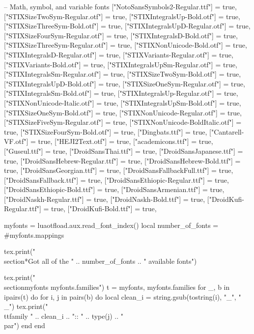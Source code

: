\documentclass{article}
\begin{document}
\begin{luacode*}
{    -- Math, symbol, and variable fonts
    ["NotoSansSymbols2-Regular.ttf"] = true,
    ["STIXSizeTwoSym-Regular.otf"] = true,
    ["STIXIntegralsUp-Bold.otf"] = true,
    ["STIXSizeThreeSym-Bold.otf"] = true,
    ["STIXIntegralsUpD-Regular.otf"] = true,
    ["STIXSizeFourSym-Regular.otf"] = true,
    ["STIXIntegralsD-Bold.otf"] = true,
    ["STIXSizeThreeSym-Regular.otf"] = true,
    ["STIXNonUnicode-Bold.otf"] = true,
    ["STIXIntegralsD-Regular.otf"] = true,
    ["STIXVariants-Regular.otf"] = true,
    ["STIXVariants-Bold.otf"] = true,
    ["STIXIntegralsUpSm-Regular.otf"] = true,
    ["STIXIntegralsSm-Regular.otf"] = true,
    ["STIXSizeTwoSym-Bold.otf"] = true,
    ["STIXIntegralsUpD-Bold.otf"] = true,
    ["STIXSizeOneSym-Regular.otf"] = true,
    ["STIXIntegralsSm-Bold.otf"] = true,
    ["STIXIntegralsUp-Regular.otf"] = true,
    ["STIXNonUnicode-Italic.otf"] = true,
    ["STIXIntegralsUpSm-Bold.otf"] = true,
    ["STIXSizeOneSym-Bold.otf"] = true,
    ["STIXNonUnicode-Regular.otf"] = true,
    ["STIXSizeFiveSym-Regular.otf"] = true,
    ["STIXNonUnicode-BoldItalic.otf"] = true,
    ["STIXSizeFourSym-Bold.otf"] = true,
    ["Dingbats.ttf"] = true,
    ["Cantarell-VF.otf"] = true,
    ["HEJI2Text.otf"] = true,
    ["academicons.ttf"] = true,
    ["Guseul.ttf"] = true,
    ["DroidSansThai.ttf"] = true,
    ["DroidSansJapanese.ttf"] = true,
    ["DroidSansHebrew-Regular.ttf"] = true,
    ["DroidSansHebrew-Bold.ttf"] = true,
    ["DroidSansGeorgian.ttf"] = true,
    ["DroidSansFallbackFull.ttf"] = true,
    ["DroidSansFallback.ttf"] = true,
    ["DroidSansEthiopic-Regular.ttf"] = true,
    ["DroidSansEthiopic-Bold.ttf"] = true,
    ["DroidSansArmenian.ttf"] = true,
    ["DroidNaskh-Regular.ttf"] = true,
    ["DroidNaskh-Bold.ttf"] = true,
    ["DroidKufi-Regular.ttf"] = true,
    ["DroidKufi-Bold.ttf"] = true,
  }

  myfonts = luaotfload.aux.read_font_index()
  local number_of_fonts = #myfonts.mappings

  tex.print("\\section*{Got all of the " .. number_of_fonts .. " available fonts}")

  tex.print("\\section{myfonts myfonts.families}")
  t = { myfonts, myfonts.families }
  for _, b in ipairs(t) do
    for i, j in pairs(b) do
      local clean_i = string.gsub(tostring(i), "_", "\\_")
      tex.print("\\ttfamily " .. clean_i .. ":: " .. type(j) .. "\\par")
    end
  end


\end{luacode*}
\end{document}
